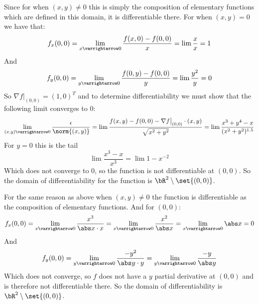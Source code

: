 \documentclass[10pt]{article}
\begin{document}
\begin{blankpp}

    \benum
        \item Since for when $(x,y)\neq0$ this is simply the composition of elementary functions which are defined in this domain, it is differentiable there.
        For when $(x,y)=0$ we have that:
        \[ f_x(0,0) = \lim_{x\varrightarrow0}\frac{f(x,0)-f(0,0)}x=\lim\frac xx=1 \]
        And
        \[ f_y(0,0) = \lim_{y\varrightarrow0}\frac{f(0,y)-f(0,0)}y=\lim\frac{y^2}y=0 \]
        So $\nabla f\big|_{(0,0)}=(1,0)^T$ and to determine differentiability we must show that the following limit converges to $0$:
        \[ \lim_{(x,y)\varrightarrow0}\frac\epsilon{\norm{(x,y)}} = \lim\frac{f(x,y)-f(0,0)-\nabla f\big|_{(0,0)}\cdot(x,y)}{\sqrt{x^2+y^2}} = \lim\frac{x^3+y^4-x}{(x^2+y^2)^{1.5}} \]
        For $y=0$ this is the tail
        \[ \lim\frac{x^3-x}{x^3} = \lim 1-x^{-2} \]
        Which does not converge to $0$, so the function is not differentiable at $(0,0)$.
        So the domain of differentiability for the function is $\bR^2\setminus\set{(0,0)}$.

        \item For the same reason as above when $(x,y)\neq0$ the function is differentiable as the composition of elementary functions.
        And for $(0,0)$:
        \[ f_x(0,0) = \lim_{x\varrightarrow0}\frac{x^3}{\abs x\cdot x} = \lim_{x\varrightarrow0}\frac{x^2}{\abs x} = \lim_{x\varrightarrow0}\abs x = 0 \]
        And
        \[ f_y(0,0) = \lim_{y\varrightarrow0}\frac{-y^2}{\abs y\cdot y}= \lim_{y\varrightarrow0}\frac{-y}{\abs y} \]
        Which does not converge, so $f$ does not have a $y$ partial derivative at $(0,0)$ and is therefore not differentiable there.
        So the domain of differentiability is $\bR^2\setminus\set{(0,0)}$.


\end{blankpp}
\end{document}
